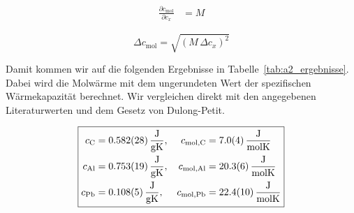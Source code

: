 \documentclass{article}
\let\OrigRef\ref
\renewcommand{\ref}[1]{{\color{linkblue}\uline{\OrigRef{#1}}}}
\renewcommand{\eqref}[1]{{\color{linkblue}\uline{\textup{(\OrigRef{#1})}}}}
\begin{document}
  \begin{align}
    \frac{\partial c_{\mathrm{mol}}}{\partial c_{x}} &= M
  \end{align}

  \begin{equation} \Delta c_{\mathrm{mol}} = \sqrt{\left(M\,\Delta c_{x}\right)^2} \end{equation}


Damit kommen wir auf die folgenden Ergebnisse in Tabelle~\ref{tab:a2_ergebnisse}. 
Dabei wird die Molwärme mit dem ungerundeten Wert der spezifischen Wärmekapazität
berechnet. Wir vergleichen direkt mit den angegebenen Literaturwerten und
dem Gesetz von Dulong-Petit.

\begin{table}[H]
	\centering
	\caption{Spezifische Wärmekapazitäten und Molwärmen; $t_\mathrm{lit}$: $\sigma$-Vergleich mit dem Literaturwert (gilt für $c_x$ und $c_\mathrm{mol}$ gleichermaßen, da $M$ exakt), $t_\mathrm{DP}$: $\sigma$-Vergleich von $c_\mathrm{mol}$ mit $3R = \qty{24.942}{\frac{\joule}{\mol\kelvin}}$, beide nach Gl.~\eqref{eq:a2_sigma}.}
	\label{tab:a2_ergebnisse}
\end{table}

\begin{equation}
	\boxed{
		\begin{aligned}
			c_\mathrm{C}  &= \qty{0.582(28)}{\frac{\joule}{\gram\kelvin}}, & c_\mathrm{mol,C}  &= \qty{7.0(4)}{\frac{\joule}{\mol\kelvin}}\\
			c_\mathrm{Al} &= \qty{0.753(19)}{\frac{\joule}{\gram\kelvin}}, & c_\mathrm{mol,Al} &= \qty{20.3(6)}{\frac{\joule}{\mol\kelvin}}\\
			c_\mathrm{Pb} &= \qty{0.108(5)}{\frac{\joule}{\gram\kelvin}}, & c_\mathrm{mol,Pb} &= \qty{22.4(10)}{\frac{\joule}{\mol\kelvin}}
		\end{aligned}
	}
\end{equation}
\end{document}
